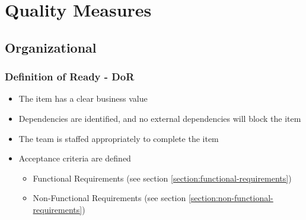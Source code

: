 \chapter{Quality Measures}

    
    

\section{Organizational}

\subsection{Definition of Ready - DoR}

\begin{itemize}
  \item The item has a clear business value
  \item Dependencies are identified, and no external dependencies will block the item
  \item The team is staffed appropriately to complete the item
  \item Acceptance criteria are defined
    \begin{itemize}
      \item Functional Requirements (see section \ref{section:functional-requirements})
      \item Non-Functional Requirements (see section \ref{section:non-functional-requirements})
    \end{itemize}
\end{itemize}

